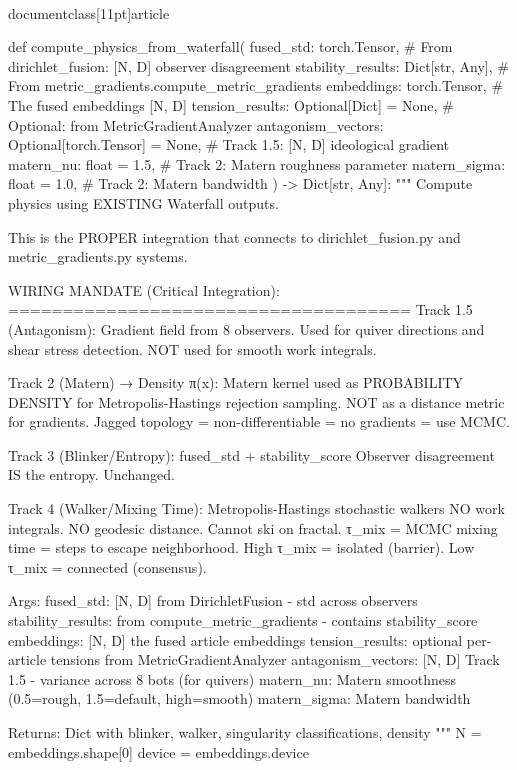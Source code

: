 \\documentclass[11pt]{article}
\begin{document}
\begin{CodeBlock}
def compute_physics_from_waterfall(
    fused_std: torch.Tensor,           # From dirichlet_fusion: [N, D] observer disagreement
    stability_results: Dict[str, Any], # From metric_gradients.compute_metric_gradients
    embeddings: torch.Tensor,          # The fused embeddings [N, D]
    tension_results: Optional[Dict] = None,  # Optional: from MetricGradientAnalyzer
    antagonism_vectors: Optional[torch.Tensor] = None,  # Track 1.5: [N, D] ideological gradient
    matern_nu: float = 1.5,            # Track 2: Matern roughness parameter
    matern_sigma: float = 1.0,         # Track 2: Matern bandwidth
) -> Dict[str, Any]:
    """
    Compute physics using EXISTING Waterfall outputs.

    This is the PROPER integration that connects to dirichlet_fusion.py
    and metric_gradients.py systems.

    WIRING MANDATE (Critical Integration):
    =====================================
    Track 1.5 (Antagonism):
        Gradient field from 8 observers. Used for quiver directions and
        shear stress detection. NOT used for smooth work integrals.

    Track 2 (Matern) → Density π(x):
        Matern kernel used as PROBABILITY DENSITY for Metropolis-Hastings
        rejection sampling. NOT as a distance metric for gradients.
        Jagged topology = non-differentiable = no gradients = use MCMC.

    Track 3 (Blinker/Entropy): fused_std + stability_score
        Observer disagreement IS the entropy. Unchanged.

    Track 4 (Walker/Mixing Time): Metropolis-Hastings stochastic walkers
        NO work integrals. NO geodesic distance. Cannot ski on fractal.
        τ_mix = MCMC mixing time = steps to escape neighborhood.
        High τ_mix = isolated (barrier). Low τ_mix = connected (consensus).

    Args:
        fused_std: [N, D] from DirichletFusion - std across observers
        stability_results: from compute_metric_gradients - contains stability_score
        embeddings: [N, D] the fused article embeddings
        tension_results: optional per-article tensions from MetricGradientAnalyzer
        antagonism_vectors: [N, D] Track 1.5 - variance across 8 bots (for quivers)
        matern_nu: Matern smoothness (0.5=rough, 1.5=default, high=smooth)
        matern_sigma: Matern bandwidth

    Returns:
        Dict with blinker, walker, singularity classifications, density
    """
    N = embeddings.shape[0]
    device = embeddings.device


\end{CodeBlock}
\end{document}
